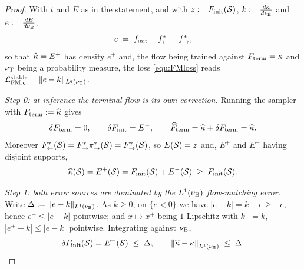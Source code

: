 \begin{proof}
With $t$ and $E$ as in the statement, and with $z:=F_{\mathrm{init}}(\mathcal S)$, $k:=\frac{d\kappa}{d\nu_{\mathrm{B}}}$ and $e:=\frac{dE}{d\nu_{\mathrm{B}}}$,
\begin{equation}
    e \;=\; f_{\mathrm{init}}+f^*_{\leftarrow}-f^*_{\rightarrow},
\end{equation}
so that $\widehat{\kappa} = E^+$ has density $e^+$ and, the flow being trained against $F_{\mathrm{term}}=\kappa$ and $\nu_{\mathrm{T}}$ being a probability measure, the loss \eqref{equ:FMloss} reads $\mathcal L_{\mathrm{FM},q}^{\mathrm{stable}} = \|e-k\|_{L^q(\nu_{\mathrm{T}})}$.

\emph{Step 0: at inference the terminal flow is its own correction.} Running the sampler with $F_{\mathrm{term}} := \widehat{\kappa}$ gives
\begin{equation}\label{equ:inference_defect}
    \delta F_{\mathrm{term}}  = 0,\qquad \delta F_{\mathrm{init}}  = E^-,\qquad \widehat{F}_{\mathrm{term}} = \widehat{\kappa}+\delta F_{\mathrm{term}} = \widehat{\kappa} .
\end{equation}
 Moreover $F^*_{\leftarrow}(\mathcal S) = F^*_{\rightarrow}\pi_{\rightarrow}^*(\mathcal S) = F^*_{\rightarrow}(\mathcal S)$, so $E(\mathcal S) = z$ and, $E^+$ and $E^-$ having disjoint supports,
\begin{equation}\label{equ:mass_identity}
    \widehat{\kappa}(\mathcal S) = E^+(\mathcal S) = F_{\mathrm{init}}(\mathcal S)+E^-(\mathcal S)\;\geq\;  F_{\mathrm{init}}(\mathcal S).
\end{equation}

\emph{Step 1: both error sources are dominated by the $L^1(\nu_{\mathrm{B}})$ flow-matching error.} Write $\Delta:=\|e-k\|_{L^1(\nu_{\mathrm{B}})}$. As $k\geq0$, on $\{e<0\}$ we have $|e-k| = k-e\geq -e$, hence $e^-\leq|e-k|$ pointwise; and $x\mapsto x^+$ being $1$-Lipschitz with $k^+=k$, $|e^+-k|\leq|e-k|$ pointwise. Integrating against $\nu_{\mathrm{B}}$,
\begin{equation}\label{equ:two_dominations}
    \delta F_{\mathrm{init}}(\mathcal S) = E^-(\mathcal S)\;\leq\;\Delta,\qquad \left\|\widehat{\kappa}-\kappa\right\|_{L^1(\nu_{\mathrm{B}})}\;\leq\;\Delta .
\end{equation}


\end{proof}
